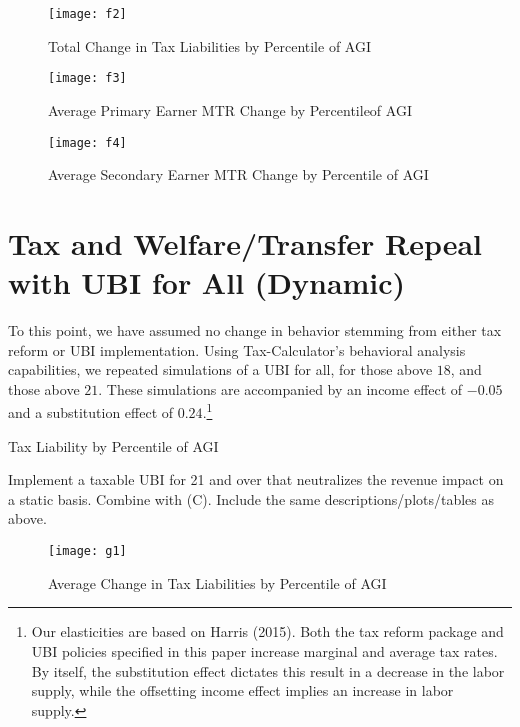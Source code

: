 \documentclass{article}
\begin{document}
\begin{figure}[H]
\centering
\caption{Total Change in Tax Liabilities by Percentile of AGI}
\texttt{[image: f2]}
\end{figure}

\begin{figure}[H]
\centering
\caption{Average Primary Earner MTR Change by Percentileof AGI}
\texttt{[image: f3]}
\end{figure}

\begin{figure}[H]
\centering
\caption{Average Secondary Earner MTR Change by Percentile of AGI}
\texttt{[image: f4]}
\end{figure}

\section{Tax and Welfare/Transfer Repeal with UBI for All (Dynamic)}
To this point, we have assumed no change in behavior stemming from either tax reform or UBI implementation. Using Tax-Calculator’s behavioral analysis capabilities, we repeated simulations of a UBI for all, for those above $18$, and those above $21$. These simulations are accompanied by an income effect of $-0.05$ and a substitution effect of $0.24$.\footnote{Our elasticities are based on Harris (2015). Both the tax reform package and UBI policies specified in this paper increase marginal and average tax rates. By itself, the substitution effect dictates this result in a decrease in the labor supply, while the offsetting income effect implies an increase in labor supply.}

\begin{table}[H]
\caption{Tax Liability by Percentile of AGI}
\begin{center}
\begin{adjustbox}{max width=\textwidth}

\end{adjustbox}
\end{center}
\end{table}

Implement a taxable UBI for 21 and over that neutralizes the revenue impact on a static basis. Combine with (C). Include the same descriptions/plots/tables as above.



\begin{figure}[H]
\centering
\caption{Average Change in Tax Liabilities by Percentile of AGI}
\texttt{[image: g1]}
\end{figure}
\end{document}
